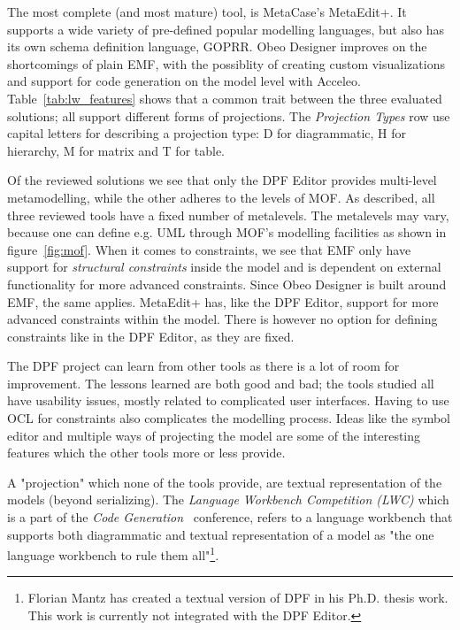 The most complete (and most mature) tool, is MetaCase's MetaEdit+. It supports a wide variety of pre-defined popular modelling languages, but also has its own schema definition language, GOPRR. Obeo Designer improves on the shortcomings of plain EMF, with the possiblity of creating custom visualizations and support for code generation on the model level with Acceleo. Table~\ref{tab:lw_features} shows that a common trait between the three evaluated solutions; all support different forms of projections. The \emph{Projection Types} row use capital letters for describing a projection type:
D for diagrammatic, H for hierarchy, M for matrix and T for table.

Of the reviewed solutions we see that only the DPF Editor provides multi-level metamodelling, while the other adheres to the levels of MOF. As described, all three reviewed tools have a fixed number of metalevels. The metalevels may vary, because one can define e.g. UML through MOF's modelling facilities as shown in figure~\ref{fig:mof}. When it comes to constraints, we see that EMF only have support for \emph{structural constraints} inside the model and is dependent on external functionality for more advanced constraints. Since Obeo Designer is built around EMF, the same applies. MetaEdit+ has, like the DPF Editor, support for more advanced constraints within the model. There is however no option for defining constraints like in the DPF Editor, as they are fixed.

The DPF project can learn from other tools as there is a lot of room for improvement. The lessons learned are both good and bad; the tools studied all have usability issues, mostly related to complicated user interfaces. Having to use OCL for constraints also complicates the modelling process. Ideas like the symbol editor and multiple ways of projecting the model are some of the interesting features which the other tools more or less provide. 

A "projection" which none of the tools provide, are textual representation of the models (beyond serializing). The \emph{Language Workbench Competition (LWC)} which is a part of the \emph{Code Generation}~\cite{lwc} conference, refers to a language workbench that supports both diagrammatic and textual representation of a model as "the one language workbench to rule them all"\footnote{Florian Mantz has created a textual version of DPF in his Ph.D. thesis work. This work is currently not integrated with the DPF Editor.}. 

\let\Oldarraystretch\arraystretch
\renewcommand*\arraystretch{1.5}

